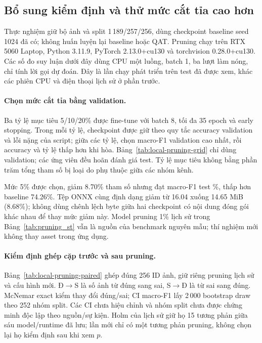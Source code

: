 \subsection{Bổ sung kiểm định và thử mức cắt tỉa cao hơn}\label{sec:local-image-update}
Thực nghiệm giữ bộ ảnh và split 1\,189/257/256, dùng checkpoint baseline seed 1024 đã có; không huấn luyện lại baseline hoặc QAT. Pruning chạy trên RTX 5060 Laptop, Python 3.11.9, PyTorch 2.13.0+cu130 và torchvision 0.28.0+cu130. Các số đo suy luận dưới đây dùng CPU một luồng, batch 1, ba lượt làm nóng, chỉ tính lời gọi dự đoán. Đây là lần chạy phát triển trên test đã được xem, khác các phiên CPU và điện thoại lịch sử ở phần trước.

\paragraph{Chọn mức cắt tỉa bằng validation.} Ba tỷ lệ mục tiêu 5/10/20\% được fine-tune với batch 8, tối đa 35 epoch và early stopping. Trong mỗi tỷ lệ, checkpoint được giữ theo quy tắc accuracy validation và lỗi nặng của script; giữa các tỷ lệ, chọn macro-F1 validation cao nhất, rồi accuracy và tỷ lệ thấp hơn khi hòa. Bảng~\ref{tab:local-pruning-grid} chỉ dùng validation; các ứng viên đều hoãn đánh giá test. Tỷ lệ mục tiêu không bằng phần trăm tổng tham số bị loại do phụ thuộc giữa các nhóm kênh.



Mức 5\% được chọn, giảm 8.70\% tham số nhưng đạt macro-F1 test \LocalPrunedFOne\%, thấp hơn baseline 74.26\%. Tệp ONNX cùng định dạng giảm từ 16.04 xuống 14.65 MiB (8.68\%); không dùng chênh lệch byte giữa hai checkpoint có nội dung đóng gói khác nhau để thay mức giảm này. Model pruning 1\% lịch sử trong Bảng~\ref{tab:pruning_st} vẫn là nguồn của benchmark nguyên mẫu; thí nghiệm mới không thay asset trong ứng dụng.

\paragraph{Kiểm định ghép cặp trước và sau pruning.} Bảng~\ref{tab:local-pruning-paired} ghép đúng 256 ID ảnh, giữ riêng pruning lịch sử và cấu hình mới. Đ$\to$S là số ảnh từ đúng sang sai, S$\to$Đ là từ sai sang đúng. McNemar exact kiểm thay đổi đúng/sai; CI macro-F1 lấy 2\,000 bootstrap draw theo 252 nhóm split. Các CI chưa hiệu chỉnh và nhóm split chưa được chứng minh độc lập theo nguồn/sự kiện. Holm của lịch sử giữ họ 15 tương phản giữa sáu model/runtime đã lưu; lần mới chỉ có một tương phản pruning, không chọn lại họ kiểm định sau khi xem $p$.

